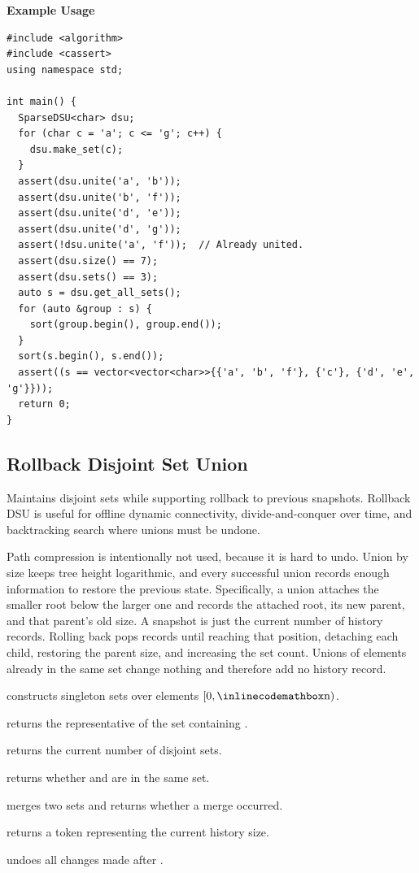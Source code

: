 \textbf{Example Usage}\par
\begin{lstlisting}[style=cpp]
#include <algorithm>
#include <cassert>
using namespace std;

int main() {
  SparseDSU<char> dsu;
  for (char c = 'a'; c <= 'g'; c++) {
    dsu.make_set(c);
  }
  assert(dsu.unite('a', 'b'));
  assert(dsu.unite('b', 'f'));
  assert(dsu.unite('d', 'e'));
  assert(dsu.unite('d', 'g'));
  assert(!dsu.unite('a', 'f'));  // Already united.
  assert(dsu.size() == 7);
  assert(dsu.sets() == 3);
  auto s = dsu.get_all_sets();
  for (auto &group : s) {
    sort(group.begin(), group.end());
  }
  sort(s.begin(), s.end());
  assert((s == vector<vector<char>>{{'a', 'b', 'f'}, {'c'}, {'d', 'e', 'g'}}));
  return 0;
}
\end{lstlisting}
\subsection{Rollback Disjoint Set Union}
\label{sec:2.8.3}
Maintains disjoint sets while supporting rollback to previous snapshots. Rollback DSU is useful for offline dynamic connectivity, divide-and-conquer over time, and backtracking search where unions must be undone.

Path compression is intentionally not used, because it is hard to undo. Union by size keeps tree height logarithmic, and every successful union records enough information to restore the previous state. Specifically, a union attaches the smaller root below the larger one and records the attached root, its new parent, and that parent's old size. A snapshot is just the current number of history records. Rolling back pops records until reaching that position, detaching each child, restoring the parent size, and increasing the set count. Unions of elements already in the same set change nothing and therefore add no history record.

\begin{compactitem}
  \item {} constructs  singleton sets over elements $[0, {\inlinecodemath{n}})$.
  \item {} returns the representative of the set containing .
  \item {} returns the current number of disjoint sets.
  \item {} returns whether  and  are in the same set.
  \item {} merges two sets and returns whether a merge occurred.
  \item {} returns a token representing the current history size.
  \item {} undoes all changes made after .
\end{compactitem}

